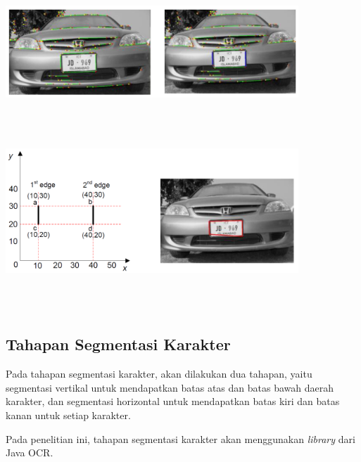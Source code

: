 \begin{enumerate}
\begin{adjustbox}{width=1\textwidth}
	\noindent\begin{minipage}{\linewidth}
		\centering\includegraphics[width=11cm]{images/SeleksiKandidatGaris.PNG}
		\label{fig:SeleksiKandidatGaris}
	\end{minipage}
\end{adjustbox}\\
\\
\begin{adjustbox}{width=1\textwidth}
	\noindent\begin{minipage}{\linewidth}
		\centering\includegraphics[width=11cm]{images/AreaPlatKendaraan.PNG}
		\label{fig:Penentuan Area Plat Kendaraan}
	\end{minipage}
\end{adjustbox}\\
\\
\end{enumerate}

\subsection{Tahapan Segmentasi Karakter}
\noindent Pada tahapan segmentasi karakter, akan dilakukan dua tahapan, yaitu segmentasi vertikal untuk mendapatkan batas atas dan batas bawah daerah karakter, dan segmentasi horizontal untuk mendapatkan batas kiri dan batas kanan untuk setiap karakter.

\noindent Pada penelitian ini, tahapan segmentasi karakter akan menggunakan \textit{library} dari Java OCR.\\

